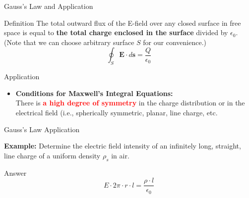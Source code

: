 \documentclass[xcolor={dvipsnames}]{beamer}
\begin{document}
\begin{frame}{Gauss’s Law and Application}
\begin{block}{Definition}
The total outward flux of the E-field over any closed surface in free space is equal to \textbf{the total charge enclosed in the surface} divided by $\epsilon_0$. (Note that we can choose arbitrary surface $S$ for our convenience.)
\[
\oint_{S} \mathbf{E} \cdot d \mathbf{s}=\frac{Q}{\epsilon_{0}}
\]
\end{block}
\begin{block}{Application}
\begin{itemize}
\item \textbf{Conditions for Maxwell's Integral Equations:}\\
There is \textcolor{red}{\textbf{a high degree of symmetry}} in the charge distribution or in the electrical field (i.e., spherically symmetric, planar, line charge, etc.
\end{itemize}
\end{block}

\end{frame}
\begin{frame}{Gauss’s Law Application}
\begin{block}{\textbf{Example:}}
Determine the electric field intensity of an infinitely long, straight, line charge of a uniform density $\rho_s$ in air.
\end{block}
\pause
\begin{block}{Answer}
$$E\cdot 2\pi \cdot r \cdot l = \frac{\rho \cdot l}{\epsilon_0}$$
\end{block}
\end{frame}
\end{document}
